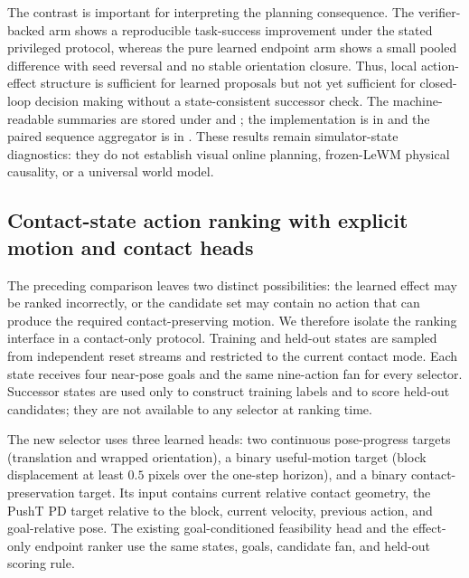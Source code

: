 \documentclass{article}
\begin{document}
The contrast is important for interpreting the planning consequence. The
verifier-backed arm shows a reproducible task-success improvement under the
stated privileged protocol, whereas the pure learned endpoint arm shows a
small pooled difference with seed reversal and no stable orientation closure.
Thus, local action-effect structure is sufficient for learned proposals but
not yet sufficient for closed-loop decision making without a state-consistent
successor check.  The machine-readable summaries are stored under
 and
;
the implementation is in
 and the paired
sequence aggregator is in
.  These results
remain simulator-state diagnostics: they do not establish visual online
planning, frozen-LeWM physical causality, or a universal world model.

\subsection{Contact-state action ranking with explicit motion and contact heads}
\label{sec:supp-contact-mode-effective-motion}

The preceding comparison leaves two distinct possibilities: the learned
effect may be ranked incorrectly, or the candidate set may contain no action
that can produce the required contact-preserving motion. We therefore isolate
the ranking interface in a contact-only protocol. Training and held-out states
are sampled from independent reset streams and restricted to the current
contact mode. Each state receives four near-pose goals and the same nine-action
fan for every selector. Successor states are used only to construct training
labels and to score held-out candidates; they are not available to any
selector at ranking time.

The new selector uses three learned heads: two continuous pose-progress
targets (translation and wrapped orientation), a binary useful-motion target
(block displacement at least $0.5$ pixels over the one-step horizon), and a
binary contact-preservation target. Its input contains current relative
contact geometry, the PushT PD target relative to the block, current velocity,
previous action, and goal-relative pose. The existing goal-conditioned
feasibility head and the effect-only endpoint ranker use the same states,
goals, candidate fan, and held-out scoring rule.
\end{document}

